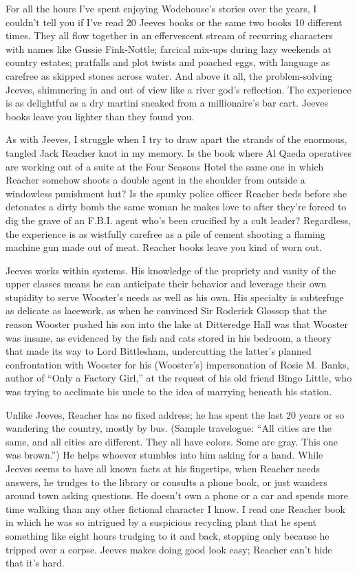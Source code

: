 For all the hours I've spent enjoying Wodehouse's stories over the
years, I couldn't tell you if I've read 20 Jeeves books or the same two
books 10 different times. They all flow together in an effervescent
stream of recurring characters with names like Gussie Fink-Nottle;
farcical mix-ups during lazy weekends at country estates; pratfalls and
plot twists and poached eggs, with language as carefree as skipped
stones across water. And above it all, the problem-solving Jeeves,
shimmering in and out of view like a river god's reflection. The
experience is as delightful as a dry martini sneaked from a
millionaire's bar cart. Jeeves books leave you lighter than they found
you.

As with Jeeves, I struggle when I try to draw apart the strands of the
enormous, tangled Jack Reacher knot in my memory. Is the book where Al
Qaeda operatives are working out of a suite at the Four Seasons Hotel
the same one in which Reacher somehow shoots a double agent in the
shoulder from outside a windowless punishment hut? Is the spunky police
officer Reacher beds before she detonates a dirty bomb the same woman he
makes love to after they're forced to dig the grave of an F.B.I. agent
who's been crucified by a cult leader? Regardless, the experience is as
wistfully carefree as a pile of cement shooting a flaming machine gun
made out of meat. Reacher books leave you kind of worn out.

Jeeves works within systems. His knowledge of the propriety and vanity
of the upper classes means he can anticipate their behavior and leverage
their own stupidity to serve Wooster's needs as well as his own. His
specialty is subterfuge as delicate as lacework, as when he convinced
Sir Roderick Glossop that the reason Wooster pushed his son into the
lake at Ditteredge Hall was that Wooster was insane, as evidenced by the
fish and cats stored in his bedroom, a theory that made its way to Lord
Bittlesham, undercutting the latter's planned confrontation with Wooster
for his (Wooster's) impersonation of Rosie M. Banks, author of ``Only a
Factory Girl,'' at the request of his old friend Bingo Little, who was
trying to acclimate his uncle to the idea of marrying beneath his
station.

Unlike Jeeves, Reacher has no fixed address; he has spent the last 20
years or so wandering the country, mostly by bus. (Sample travelogue:
``All cities are the same, and all cities are different. They all have
colors. Some are gray. This one was brown.'') He helps whoever stumbles
into him asking for a hand. While Jeeves seems to have all known facts
at his fingertips, when Reacher needs answers, he trudges to the library
or consults a phone book, or just wanders around town asking questions.
He doesn't own a phone or a car and spends more time walking than any
other fictional character I know. I read one Reacher book in which he
was so intrigued by a suspicious recycling plant that he spent something
like eight hours trudging to it and back, stopping only because he
tripped over a corpse. Jeeves makes doing good look easy; Reacher can't
hide that it's hard.

